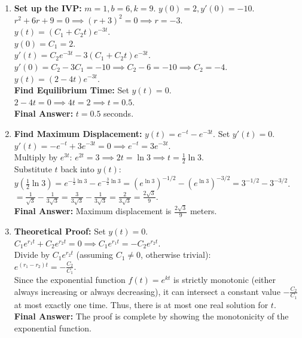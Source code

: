 \documentclass[11pt]{article}
\begin{document}
\begin{enumerate}[label=\textbf{\arabic*.}]
    \item \textbf{Set up the IVP:} $m=1, b=6, k=9$. $y(0) = 2, y'(0) = -10$. \\
    $r^2 + 6r + 9 = 0 \implies (r+3)^2 = 0 \implies r = -3$. \\
    $y(t) = (C_1 + C_2 t)e^{-3t}$. \\
    $y(0) = C_1 = 2$. \\
    $y'(t) = C_2 e^{-3t} - 3(C_1 + C_2 t)e^{-3t}$. \\
    $y'(0) = C_2 - 3C_1 = -10 \implies C_2 - 6 = -10 \implies C_2 = -4$. \\
    $y(t) = (2 - 4t)e^{-3t}$. \\
    \textbf{Find Equilibrium Time:} Set $y(t) = 0$. \\
    $2 - 4t = 0 \implies 4t = 2 \implies t = 0.5$. \\
    \textbf{Final Answer:} $t = 0.5$ seconds.

    \item \textbf{Find Maximum Displacement:} $y(t) = e^{-t} - e^{-3t}$. Set $y'(t) = 0$. \\
    $y'(t) = -e^{-t} + 3e^{-3t} = 0 \implies e^{-t} = 3e^{-3t}$. \\
    Multiply by $e^{3t}$: $e^{2t} = 3 \implies 2t = \ln 3 \implies t = \frac{1}{2}\ln 3$. \\
    Substitute $t$ back into $y(t)$: \\
    $y\left(\frac{1}{2}\ln 3\right) = e^{-\frac{1}{2}\ln 3} - e^{-\frac{3}{2}\ln 3} = (e^{\ln 3})^{-1/2} - (e^{\ln 3})^{-3/2} = 3^{-1/2} - 3^{-3/2}$. \\
    $= \frac{1}{\sqrt{3}} - \frac{1}{3\sqrt{3}} = \frac{3}{3\sqrt{3}} - \frac{1}{3\sqrt{3}} = \frac{2}{3\sqrt{3}} = \frac{2\sqrt{3}}{9}$. \\
    \textbf{Final Answer:} Maximum displacement is $\frac{2\sqrt{3}}{9}$ meters.

    \item \textbf{Theoretical Proof:} Set $y(t) = 0$. \\
    $C_1 e^{r_1 t} + C_2 e^{r_2 t} = 0 \implies C_1 e^{r_1 t} = -C_2 e^{r_2 t}$. \\
    Divide by $C_1 e^{r_2 t}$ (assuming $C_1 \neq 0$, otherwise trivial): \\
    $e^{(r_1 - r_2)t} = -\frac{C_2}{C_1}$. \\
    Since the exponential function $f(t) = e^{kt}$ is strictly monotonic (either always increasing or always decreasing), it can intersect a constant value $-\frac{C_2}{C_1}$ at most exactly one time. Thus, there is at most one real solution for $t$. \\
    \textbf{Final Answer:} The proof is complete by showing the monotonicity of the exponential function.


\end{enumerate}
\end{document}
